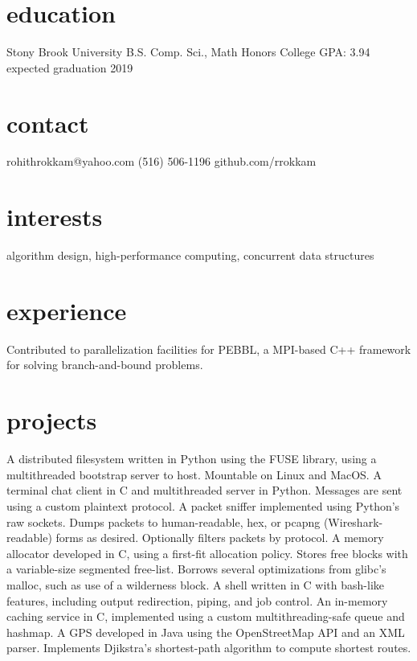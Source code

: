 \documentclass{cv}
\begin{document}

\begin{aside}
  \section{education}
    Stony Brook University
    B.S. Comp. Sci., Math
    Honors College
    GPA: 3.94
    expected graduation 2019
  \section{contact}
    rohithrokkam@yahoo.com
    (516) 506-1196
    github.com/rrokkam
\end{aside}

\section{interests}

algorithm design, high-performance computing, concurrent data structures

\section{experience}

\begin{entrylist}
    {Contributed to parallelization facilities for PEBBL, a MPI-based C++ framework for solving branch-and-bound problems.}
\end{entrylist}

\section{projects}

\begin{entrylist}
    {A distributed filesystem written in Python using the FUSE library, using a multithreaded bootstrap server to host. Mountable on Linux and MacOS.}
    {A terminal chat client in C and multithreaded server in Python. Messages are sent using a custom plaintext protocol.}
    {A packet sniffer implemented using Python's raw sockets. Dumps packets to human-readable, hex, or pcapng (Wireshark-readable) forms as desired. Optionally filters packets by protocol.}
    {A memory allocator developed in C, using a first-fit allocation policy. Stores free blocks with a variable-size segmented free-list. Borrows several optimizations from glibc's malloc, such as use of a wilderness block.}
    {A shell written in C with bash-like features, including output redirection, piping, and job control.}
    {An in-memory caching service in C, implemented using a custom multithreading-safe queue and hashmap.}
    {A GPS developed in Java using the OpenStreetMap API and an XML parser. Implements Djikstra's shortest-path algorithm to compute shortest routes.}
\end{entrylist}
\end{document}
